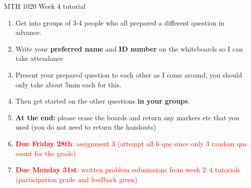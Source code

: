 \documentclass{beamer}
\begin{document}
\begin{frame}{MTH 1020 Week 4 tutorial}
\begin{enumerate}
  \item Get into groups of 3-4 people who all prepared a different question in advance.
  \item Write your \textbf{preferred name} and \textbf{ID number} on the whiteboards so I can take attendance
  \item Present your prepared question to each other as I come around, you should only take about 5min each for this.
  \item Then get started on the other questions \textbf{in your groups}.
  \item \textbf{At the end:} please erase the boards and return any markers etc that you used (you do not need to return the handouts)
  \item \textcolor{red}{\textbf{Due Friday 28th}: assignment 3 (attempt all 6 qns since only 3 random qns count for the grade)}
  \item \textcolor{red}{\textbf{Due Monday 31st}: written problem submissions from week 2--4 tutorials (participation grade and feedback given)}
\end{enumerate}
\end{frame}
\end{document}
